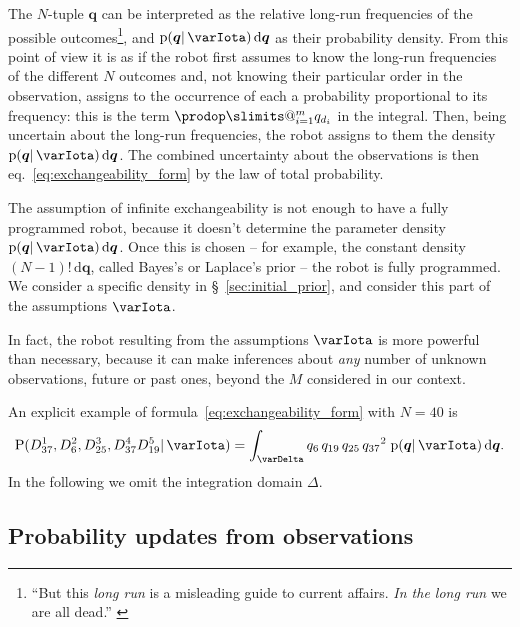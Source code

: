 \documentclass[\ifafour a4paper,12pt,\else a5paper,10pt,\fi%
onecolumn,oneside,article,%
british%
]{memoir}
\makeatletter
\theoremstyle{remark}
\theoremstyle{innote}
\def\prod{\DOTSI\prodop\slimits@}
\newcommand*{\citep}{\parencites}
\newcommand*{\citey}{\parencites*}
\newcommand*{\di}{\mathrm{d}}%
\newcommand*{\pf}{\mathrm{p}}%
\newcommand*{\p}{\mathrm{P}}%
\renewcommand*{\|}{\mathpunct{|}}
\newcommand*{\sect}{\S}%
\newcommand*{\eqn}{eq.}%
\newcommand*{\simpl}{\varDelta}
\newcommand*{\yqq}{q}
\newcommand*{\yq}{\bm{\yqq}}
\newcommand*{\yI}{\varIota}
\makeatother
\begin{document}
The $N$-tuple $\yq$ can be interpreted as the relative long-run frequencies
of the possible outcomes\footnote{\enquote{But this \emph{long run} is a
    misleading guide to current affairs. \emph{In the long run} we are all
    dead.} \citep[\sect~3.I, p.~65]{keynes1923_r2013}}, and
$\pf(\yq \| \yI)\,\di\yq$ as their probability density. From this point of
view it is as if the robot first assumes to know the long-run frequencies
of the different $N$ outcomes and, not knowing their particular order in
the observation, assigns to the occurrence of each a probability
proportional to its frequency: this is the term $\prod_{i=1}^m \yqq_{d_i}$
in the integral. Then, being uncertain about the long-run frequencies, the
robot assigns to them the density $\pf(\yq \| \yI)\,\di\yq$. The combined
uncertainty about the observations is then
\eqn~\eqref{eq:exchangeability_form} by the law of total probability.

The assumption of infinite exchangeability is not enough to have a fully
programmed robot, because it doesn't determine the parameter density
$\pf(\yq \| \yI)\,\di\yq$. Once this is chosen -- for example, the constant
density $(N-1)!\,\di\yq$, called Bayes's \citey[Scholium]{bayes1763} or
Laplace's \citey[p.~xvii]{laplace1814_r1819} prior -- the robot is fully
programmed. We consider a specific density in
\sect~\ref{sec:initial_prior}, and consider this part of the assumptions
$\yI$.

In fact, the robot resulting from the assumptions $\yI$ is more powerful
than necessary, because it can make inferences about \emph{any} number of
unknown observations, future or past ones, beyond the $M$ considered in our
context.

An explicit example of formula~\eqref{eq:exchangeability_form} with $N=40$ is
\begin{equation}
  \label{eq:exchangeability_form_example}
  \p(D^1_{37} , D^2_{6} , D^3_{25}, D^4_{37} D^5_{19}\| \yI) =
  \int_\simpl \yqq_{6}\,\yqq_{19}\, \yqq_{25} \, {\yqq_{37}}^2\;
  \pf(\yq \| \yI)\,\di\yq.
\end{equation}
In the following we omit the integration domain $\simpl$.

\subsection{Probability updates from observations}
\label{sec:update_first_robot}
\end{document}
